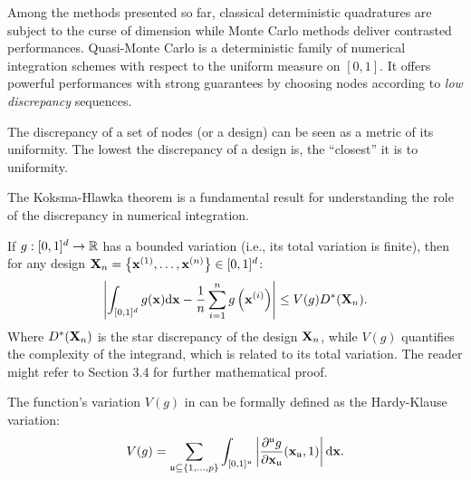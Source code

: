 Among the methods presented so far, classical deterministic quadratures are subject to the curse of dimension while Monte Carlo methods deliver contrasted performances. 
Quasi-Monte Carlo is a deterministic family of numerical integration schemes with respect to the uniform measure on $[0, 1]$. 
It offers powerful performances with strong guarantees by choosing nodes according to \textit{low discrepancy} sequences. 

The discrepancy of a set of nodes (or a design) can be seen as a metric of its uniformity. 
The lowest the discrepancy of a design is, the ``closest'' it is to uniformity. 

The Koksma-Hlawka theorem \citep{morokoff_1995,leobacher_2014} is a fundamental result for understanding the role of the discrepancy in numerical integration. 
\begin{theorem}
    If $g:[0, 1]^d\rightarrow\mathbb{R}$ has a bounded variation (i.e., its total variation is finite), then for any design ${\bf X}_n = \left\{{\bf x}^{(1)}, \dots, {\bf x}^{(n)}\right\} \in [0, 1]^d$:
    \begin{equation}
        \left| \int_{[0, 1]^d} g({\bf x}) \mathrm{d}{\bf x} - \frac1n \sum_{i=1}^n g\left({\bf x}^{(i)}\right)\right| \leq  V(g) D^*({\bf X}_n).
        \label{eq:koksma_inequality}
    \end{equation}
    Where $D^*({\bf X}_n)$ is the star discrepancy of the design ${\bf X}_n$, while $V(g)$ quantifies the complexity of the integrand, which is related to its total variation. 
    The reader might refer to \citet{leobacher_2014} Section 3.4 for further mathematical proof.
\end{theorem}

The function's variation $V(g)$ in  can be formally defined as the Hardy-Klause variation: 
\begin{equation}
    V(g) = \sum_{\mathfrak{u}\subseteq\{1, \dots, p \}} \int_{[0, 1]^\mathfrak{u}} \left| \frac{\partial^{\mathfrak{u}}g}{\partial {\bf x}_{\mathfrak{u}}}({\bf x}_{\mathfrak{u}}, 1)\right| \mathrm{d}{\bf x}.
\end{equation}

